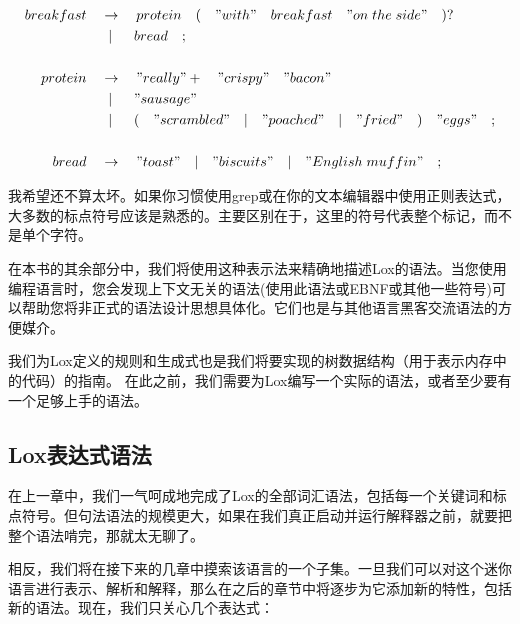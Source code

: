 \documentclass[cn,11pt,chinese]{elegantbook}
\begin{document}
\begin{itemize}
\begin{tcolorbox}
\begin{align*}
breakfast \quad & \rightarrow \quad protein \quad ( \quad \mathtt{"}with\mathtt{"} \quad breakfast \quad \mathtt{"}on \; the \; side\mathtt{"} \quad )? \\
& \;\; \vert \;\;\quad bread \quad ; \\
\\
protein \quad & \rightarrow \quad \mathtt{"}really\mathtt{"}+ \quad \mathtt{"}crispy\mathtt{"} \quad \mathtt{"}bacon\mathtt{"}\\
& \;\; \vert \;\;\quad \mathtt{"}sausage\mathtt{"}\\
& \;\; \vert \;\;\quad ( \quad \mathtt{"}scrambled\mathtt{"} \quad \vert \quad \mathtt{"}poached\mathtt{"} \quad \vert \quad \mathtt{"}fried\mathtt{"} \quad ) \quad \mathtt{"}eggs\mathtt{"} \quad ;\\
\\
bread \quad & \rightarrow \quad \mathtt{"}toast\mathtt{"} \quad\vert\quad \mathtt{"}biscuits\mathtt{"} \quad\vert\quad \mathtt{"}English \; muffin\mathtt{"} \quad ;
\end{align*}
\end{tcolorbox}

\end{itemize}

我希望还不算太坏。如果你习惯使用grep或在你的文本编辑器中使用正则表达式，大多数的标点符号应该是熟悉的。主要区别在于，这里的符号代表整个标记，而不是单个字符。

在本书的其余部分中，我们将使用这种表示法来精确地描述Lox的语法。当您使用编程语言时，您会发现上下文无关的语法(使用此语法或EBNF或其他一些符号)可以帮助您将非正式的语法设计思想具体化。它们也是与其他语言黑客交流语法的方便媒介。

我们为Lox定义的规则和生成式也是我们将要实现的树数据结构（用于表示内存中的代码）的指南。 在此之前，我们需要为Lox编写一个实际的语法，或者至少要有一个足够上手的语法。

\subsection{Lox表达式语法}

在上一章中，我们一气呵成地完成了Lox的全部词汇语法，包括每一个关键词和标点符号。但句法语法的规模更大，如果在我们真正启动并运行解释器之前，就要把整个语法啃完，那就太无聊了。

相反，我们将在接下来的几章中摸索该语言的一个子集。一旦我们可以对这个迷你语言进行表示、解析和解释，那么在之后的章节中将逐步为它添加新的特性，包括新的语法。现在，我们只关心几个表达式：
\end{document}
